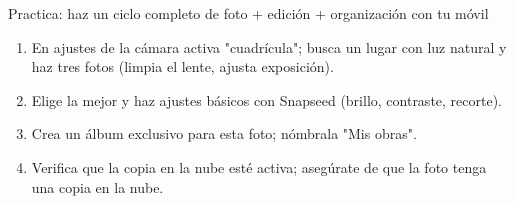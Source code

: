\begin{tcbpractice}{Practica: haz un ciclo completo de foto + edición + organización con tu móvil}
\begin{enumerate}
  \item En ajustes de la cámara activa "cuadrícula"; busca un lugar con luz natural y haz tres fotos (limpia el lente, ajusta exposición).
  \item Elige la mejor y haz ajustes básicos con Snapseed (brillo, contraste, recorte).
  \item Crea un álbum exclusivo para esta foto; nómbrala "Mis obras".
  \item Verifica que la copia en la nube esté activa; asegúrate de que la foto tenga una copia en la nube.
\end{enumerate}

\end{tcbpractice}

